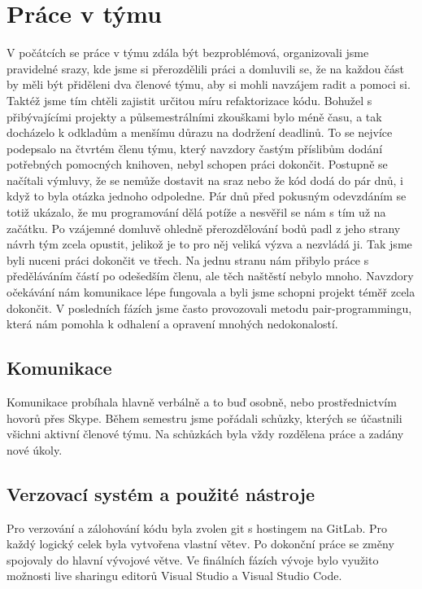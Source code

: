 \documentclass[12pt, a4paper]{article}
\begin{document}
\section{Práce v týmu}
\justifying
V počátcích se práce v týmu zdála být bezproblémová, organizovali jsme pravidelné srazy, kde jsme si přerozdělili práci a domluvili se, že na každou část by měli být přiděleni dva členové týmu, aby si mohli navzájem radit a pomoci si. Taktéž jsme tím chtěli zajistit určitou míru refaktorizace kódu. Bohužel s přibývajícími projekty a půlsemestrálními zkouškami bylo méně času, a tak docházelo k odkladům a menšímu důrazu na dodržení deadlinů. To se nejvíce podepsalo na čtvrtém členu týmu, který navzdory častým příslibům dodání potřebných pomocných knihoven, nebyl schopen práci dokončit. Postupně se načítali výmluvy, že se nemůže dostavit na sraz nebo že kód dodá do pár dnů, i když to byla otázka jednoho odpoledne. Pár dnů před pokusným odevzdáním se totiž ukázalo, že mu programování dělá potíže a nesvěřil se nám s tím už na začátku. Po vzájemné domluvě ohledně přerozdělování bodů padl z jeho strany návrh tým zcela opustit, jelikož je to pro něj veliká výzva a nezvládá ji. Tak jsme byli nuceni práci dokončit ve třech. Na jednu stranu nám přibylo práce s předěláváním částí po odešedším členu, ale těch naštěstí nebylo mnoho. Navzdory očekávání nám komunikace lépe fungovala a byli jsme schopni projekt téměř zcela dokončit. V posledních fázích jsme často provozovali metodu pair-programmingu, která nám pomohla k odhalení a opravení mnohých nedokonalostí.

\subsection{Komunikace}
\justifying
Komunikace probíhala hlavně verbálně a to buď osobně, nebo prostřednictvím hovorů přes Skype. Během semestru jsme pořádali schůzky, kterých se účastnili všichni aktivní členové týmu. Na schůzkách byla vždy rozdělena práce a zadány nové úkoly.

\subsection{Verzovací systém a použité nástroje}
\justifying
Pro verzování a zálohování kódu byla zvolen git s hostingem na GitLab. Pro každý logický celek byla vytvořena vlastní větev. Po dokonční práce se změny spojovaly do hlavní vývojové větve. Ve finálních fázích vývoje bylo využito možnosti live sharingu editorů Visual Studio a Visual Studio Code.
\end{document}
